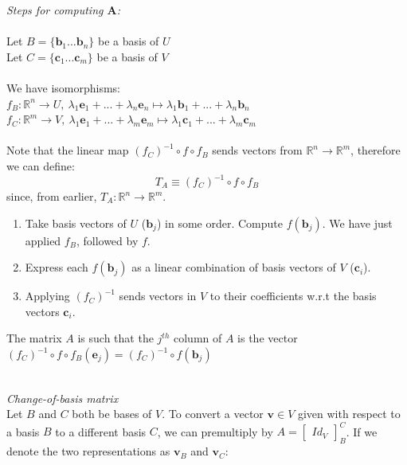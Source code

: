 \documentclass{scrartcl}
\newcommand{\R}{\mathbb{R}}
\renewcommand{\vec}[1]{\mathbf{#1}}
\begin{document}
\begin{tcolorbox}[breakable]
\textit{Steps for computing $ \vec{A} $:}
\\\\
Let $ B = \{\vec{b}_{1}...\vec{b}_{n}\} $ be a basis of $ U $
\\
Let $ C = \{\vec{c}_{1}...\vec{c}_{m}\} $ be a basis of $ V $
\\\\
We have isomorphisms:
\\
$ f_{B} : \R^{n} \to U, \ \lambda_{1}\vec{e}_{1} + ... + \lambda_{n}\vec{e}_{n} \mapsto \lambda_{1}\vec{b}_{1} + ... + \lambda_{n}\vec{b}_{n} $
\\
$ f_{C} : \R^{m} \to V, \ \lambda_{1}\vec{e}_{1} + ... + \lambda_{m}\vec{e}_{m} \mapsto \lambda_{1}\vec{c}_{1} + ... + \lambda_{m}\vec{c}_{m} $
\\\\
Note that the linear map $ (f_{C})^{-1} \circ f \circ f_{B} $ sends vectors from $ \R^{n} \to \R^{m} $, therefore we can define:
\begin{equation}
T_{A} \equiv (f_{C})^{-1} \circ f \circ f_{B}
\end{equation}
since, from earlier, $ T_{A} : \R^{n} \to \R^{m} $.
\begin{enumerate}[leftmargin=*]
\item Take basis vectors of $ U $ ($ \vec{b}_{j} $) in some order. Compute $ f(\vec{b}_{j}) $. We have just applied $ f_{B} $, followed by $ f $.
\item Express each $ f(\vec{b}_{j}) $ as a linear combination of basis vectors of $ V $ ($ \vec{c}_{i} $).
\item Applying $ (f_{C})^{-1} $ sends vectors in $ V $ to their coefficients w.r.t the basis vectors $ \vec{c}_{i} $.
\end{enumerate}
The matrix $ A $ is such that the $ j^{th} $ column of $ A $ is the vector $ (f_{C})^{-1} \circ f \circ f_{B}(\vec{e}_{j})  = (f_{C})^{-1} \circ f(\vec{b}_{j}) $
\end{tcolorbox}
\noindent
\\
\textit{Change-of-basis matrix}
\\
Let $ B $ and $ C $ both be bases of $ V $. To convert a vector $ \vec{v} \in V $ given with respect to a basis $ B $ to a different basis $ C $, we can premultiply by $ A = 
\begin{bmatrix}
Id_{V}
\end{bmatrix}_{B}^{C} $. If we denote the two representations as $ \vec{v}_{B} $ and $ \vec{v}_{C} $:
\end{document}
